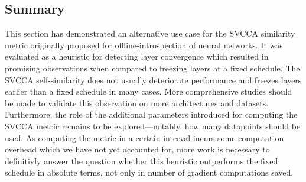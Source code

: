 \subsection{Summary}%
\label{sub:svcca-conclusion}

This section has demonstrated an alternative use case for the SVCCA similarity
metric originally proposed for offline-introspection of neural networks. It was
evaluated as a heuristic for detecting layer convergence which resulted in
promising observations when compared to freezing layers at a fixed schedule. The
SVCCA self-similarity does not usually deteriorate performance and freezes
layers earlier than a fixed schedule in many cases.
More comprehensive studies should be made to validate this observation on more
architectures and datasets. Furthermore, the role of the additional parameters
introduced for computing the SVCCA metric remains to be explored---notably, how
many datapoints should be used. As computing the metric in a certain interval
incurs some computation overhead which we have not yet accounted for, more work
is necessary to definitivly answer the question whether this heuristic
outperforms the fixed schedule in absolute terms, not only in number of gradient
computations saved.
